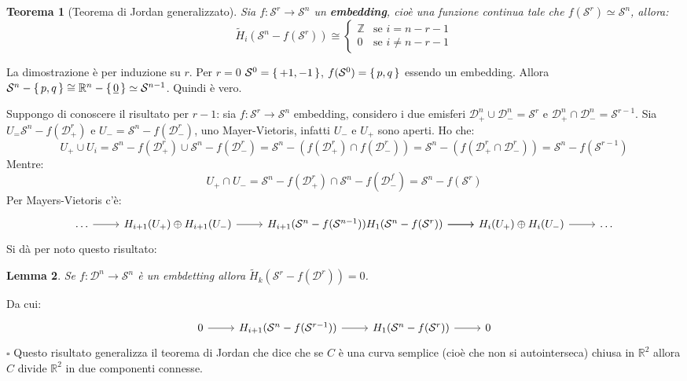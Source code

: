\documentclass[10pt, twoside=false, x11names]{scrbook}
\newtheorem{theorem}{Teorema}[section]
\newtheorem{lemma}[theorem]{Lemma}
\newenvironment{proof}{{\textbf{Dimostrazione}:}}{\hfill $\square$}
\newcommand{\Z}{\mathbb{Z}}
\newcommand{\RN}[1][]{\mathbb{R}^#1}
\newcommand{\Sph}[1][]{\mathcal{S}^#1}
\newcommand{\Disk}[1][]{\mathcal{D}^#1}
\renewcommand{\vec}[1]{\underline{#1}}
\let\setminus-
\begin{document}
\begin{theorem}[Teorema di Jordan generalizzato]
  Sia $ f \colon \Sph{r} \to \Sph{n} $ un \textbf{embedding}, cioè una funzione
  continua tale che $ f(\Sph{r}) \simeq \Sph{n} $, allora:
  \[
    \tilde{H}_i(\Sph{n} \setminus f(\Sph{r})) \cong
    \begin{cases}
      \Z & \text{se } i = n - r - 1 \\
      0 & \text{se }  i \not = n - r - 1
    \end{cases}
  \]
\end{theorem}
\begin{proof}
  La dimostrazione è per induzione su $ r $.
  Per $ r = 0 $ $ \Sph{0} = \set{+1,-1} $, $ f(\Sph{0}) = \set{p,q} $
  essendo un embedding. Allora $ \Sph{n} \setminus \set{p,q} \cong \RN{n} \setminus \set{\vec{0}} \simeq \Sph{n-1} $.
  Quindi è vero.

  Suppongo di conoscere il risultato per $ r - 1 $:
  sia $ f \colon \Sph{r} \to \Sph{n} $ embedding, considero i due emisferi
  $ \Disk{n}_+ \cup \Disk{n}_- = \Sph{r} $ e   $ \Disk{n}_+ \cap \Disk{n}_- = \Sph{r-1} $.
  Sia $ U_ = \Sph{n} \setminus f(\Disk{r}_+) $ e $ U_- = \Sph{n} \setminus f(\Disk{r}_-) $,
  uno Mayer-Vietoris, infatti $ U_- $ e $ U_+ $ sono aperti.
  Ho che:
  \[
    U_+ \cup U_i = \Sph{n} \setminus f(\Disk{r}_+) \cup \Sph{n} \setminus f(\Disk{r}_-) =
    \Sph{n} \setminus (f(\Disk{r}_+) \cap f(\Disk{r}_-)) = \Sph{n} \setminus (f(\Disk{r}_+ \cap \Disk{r}_-))
    = \Sph{n} \setminus f(\Sph{r-1})
  \]
  Mentre:
  \[
    U_+ \cap U_- = \Sph{n} \setminus f(\Disk{r}_+) \cap \Sph{n} \setminus f(\Disk{f}_-) = \Sph{n} \setminus f(\Sph{r})
  \]
  Per Mayers-Vietoris c'è:
  \[
    \begin{tikzcd}
      \dots \rar & H_{i+1}(U_+) \oplus H_{i+1}(U_-) \rar & H_{i+1}(\Sph{n} \setminus
      f(\Sph{n-1})) \rar H_1(\Sph{n} \setminus f(\Sph{r})) \rar & H_i (U_+) \oplus H_i(U_-)
      \rar & \dots
    \end{tikzcd}
  \]
  Si dà per noto questo risultato:
  \begin{lemma}
    Se $ f \colon \Disk{n} \to \Sph{n} $ è un embdetting allora $ \tilde{H}_k(\Sph{r} \setminus f(\Disk{r})) = 0 $.
  \end{lemma}
  Da cui:
  \[
    \begin{tikzcd}
      0 \rar & H_{i+1}(\Sph{n} - f(\Sph{r-1})) \rar & H_1(\Sph{n} \setminus f(\Sph{r})) \rar & 0
    \end{tikzcd}
  \]
\end{proof}
Questo risultato generalizza il teorema di Jordan che
dice che se $ C $ è una curva semplice (cioè che non si autointerseca) chiusa in
$ \RN{2} $ allora $ C $ divide $ \RN{2} $ in due componenti connesse.
\end{document}
